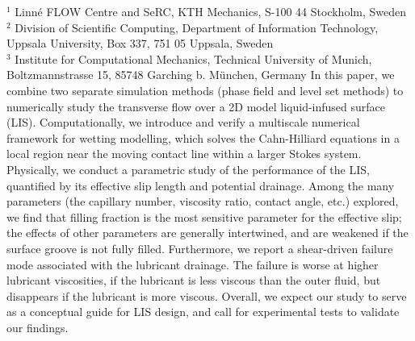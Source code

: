 %
%
%
%
%
%
%
\paperaffiliation
{%
  $^1$ Linn\'e FLOW Centre and SeRC, KTH Mechanics, S-100 44 Stockholm, Sweden\\%
  $^2$ Division of Scientific Computing, Department of Information Technology, \\Uppsala University, Box 337, 751 05 Uppsala, Sweden\\%
  $^3$ Institute for Computational Mechanics, Technical University of Munich, Boltzmannstrasse 15, 85748 Garching b. München, Germany%
}%
%
%
%
%
%
%
%
\paperpages{}%
%
%
%
\papersummary%
{%
   In this paper, we combine two separate simulation methods (phase field and level set methods) to numerically study
   the transverse flow over a 2D model liquid-infused surface (LIS).
   Computationally, we introduce and verify a multiscale numerical framework for wetting modelling,
   which solves the Cahn-Hilliard equations in a local region near the moving contact line within a larger Stokes system.
   Physically, we conduct a parametric study of the performance of the LIS, quantified by its effective slip length and potential drainage.
   Among the many parameters (the capillary number, viscosity ratio, contact angle, etc.) explored,
   we find that filling fraction is the most sensitive parameter for the effective slip;
   the effects of other parameters are generally intertwined, and are weakened if the surface groove is not fully filled.
   Furthermore, we report a shear-driven failure mode associated with the lubricant drainage.
   The failure is worse at higher lubricant viscosities, if the lubricant is less viscous than the outer fluid,
   but disappears if the lubricant is more viscous.
   Overall, we expect our study to serve as a conceptual guide for LIS design, and call for experimental tests to validate our findings.
}%
